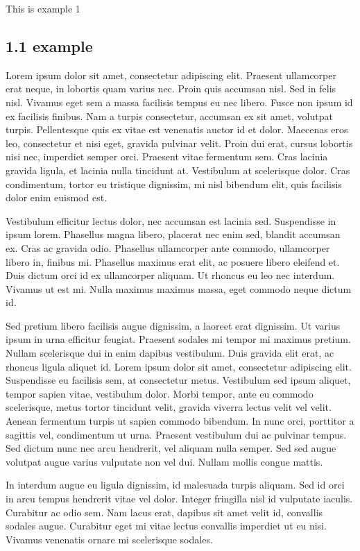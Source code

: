 This is example 1

\subsection{1.1 example}

Lorem ipsum dolor sit amet, consectetur adipiscing elit. Praesent ullamcorper erat neque, in lobortis quam varius nec. Proin quis accumsan nisl. Sed in felis nisl. Vivamus eget sem a massa facilisis tempus eu nec libero. Fusce non ipsum id ex facilisis finibus. Nam a turpis consectetur, accumsan ex sit amet, volutpat turpis. Pellentesque quis ex vitae est venenatis auctor id et dolor. Maecenas eros leo, consectetur et nisi eget, gravida pulvinar velit. Proin dui erat, cursus lobortis nisi nec, imperdiet semper orci. Praesent vitae fermentum sem. Cras lacinia gravida ligula, et lacinia nulla tincidunt at. Vestibulum at scelerisque dolor. Cras condimentum, tortor eu tristique dignissim, mi nisl bibendum elit, quis facilisis dolor enim euismod est.

Vestibulum efficitur lectus dolor, nec accumsan est lacinia sed. Suspendisse in ipsum lorem. Phasellus magna libero, placerat nec enim sed, blandit accumsan ex. Cras ac gravida odio. Phasellus ullamcorper ante commodo, ullamcorper libero in, finibus mi. Phasellus maximus erat elit, ac posuere libero eleifend et. Duis dictum orci id ex ullamcorper aliquam. Ut rhoncus eu leo nec interdum. Vivamus ut est mi. Nulla maximus maximus massa, eget commodo neque dictum id.

Sed pretium libero facilisis augue dignissim, a laoreet erat dignissim. Ut varius ipsum in urna efficitur feugiat. Praesent sodales mi tempor mi maximus pretium. Nullam scelerisque dui in enim dapibus vestibulum. Duis gravida elit erat, ac rhoncus ligula aliquet id. Lorem ipsum dolor sit amet, consectetur adipiscing elit. Suspendisse eu facilisis sem, at consectetur metus. Vestibulum sed ipsum aliquet, tempor sapien vitae, vestibulum dolor. Morbi tempor, ante eu commodo scelerisque, metus tortor tincidunt velit, gravida viverra lectus velit vel velit. Aenean fermentum turpis ut sapien commodo bibendum. In nunc orci, porttitor a sagittis vel, condimentum ut urna. Praesent vestibulum dui ac pulvinar tempus. Sed dictum nunc nec arcu hendrerit, vel aliquam nulla semper. Sed sed augue volutpat augue varius vulputate non vel dui. Nullam mollis congue mattis.

In interdum augue eu ligula dignissim, id malesuada turpis aliquam. Sed id orci in arcu tempus hendrerit vitae vel dolor. Integer fringilla nisl id vulputate iaculis. Curabitur ac odio sem. Nam lacus erat, dapibus sit amet velit id, convallis sodales augue. Curabitur eget mi vitae lectus convallis imperdiet ut eu nisi. Vivamus venenatis ornare mi scelerisque sodales.

